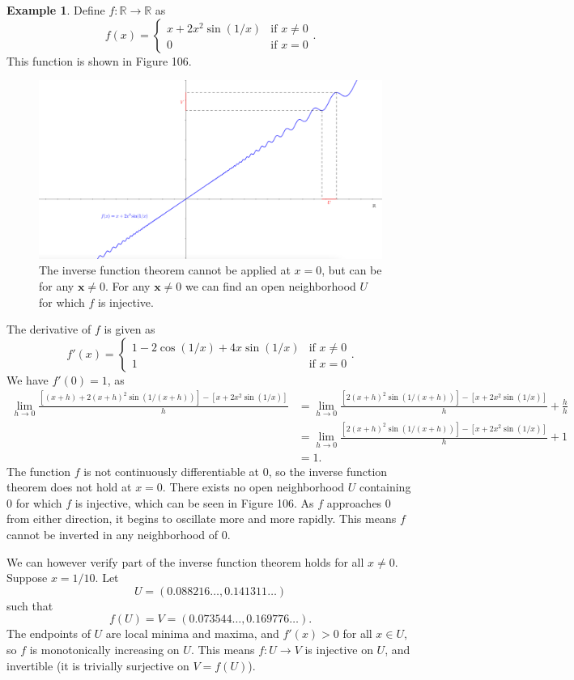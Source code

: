 \documentclass{article}
\newcommand{\R}{\mathbb{R}}
\newcommand{\x}{\mathbf{x}}
\theoremstyle{definition}
\newtheorem{example}{Example}[section]
\begin{document}
	\begin{example}
		Define $ f:\R\to\R $ as $$ f(x)=\begin{cases}
			x+2x^2\sin(1/x)&\text{if } x\neq 0\\
			0&\text{if }x=0
		\end{cases}.$$
		This function is shown in Figure 106. 
		\begin{figure}[h!]
			\centering
			\includegraphics[width=0.9\linewidth]{figures/ivt_ex1}
			\caption{The inverse function theorem cannot be applied at $ x=0 $, but can be for any $ \x \neq 0 $. For any $ \x\neq 0 $ we can find an open neighborhood $ U $ for which $ f $ is injective. }
			\label{fig:ivtex1}
		\end{figure}
		
		The derivative of $ f $ is given as 
		$$ f'(x)=\begin{cases}
			1-2\cos(1/x) + 4x\sin(1/x)&\text{if } x\neq 0\\
			1&\text{if }x=0
		\end{cases}.$$
		We have $ f'(0)=1 $, as 
		\begin{align*}
			\lim_{h\to0}\frac{[(x+h)+2(x+h)^2\sin(1/(x+h))]-[x+2x^2\sin(1/x)]}{h} & = 	\lim_{h\to0}\frac{[2(x+h)^2\sin(1/(x+h))]-[x+2x^2\sin(1/x)]}{h} + \frac{h}{h} \\ & = \lim_{h\to0}\frac{[2(x+h)^2\sin(1/(x+h))]-[x+2x^2\sin(1/x)]}{h} + 1 \\ & = 1.
		\end{align*}
		The function $ f $ is not continuously differentiable at $ 0 $, so the inverse function theorem does not hold at $ x=0 $. There exists no open neighborhood $ U $ containing $ 0 $ for which $ f $ is injective, which can be seen in Figure 106. As $ f $ approaches $ 0 $ from either direction, it begins to oscillate more and more rapidly. This means $ f $ cannot be inverted in any neighborhood of $ 0 $.  
		
		We can however verify part of the inverse function theorem holds for all $ x\neq 0 $. Suppose $ x = 1/10 $. Let $$ U = (0.088216\ldots , 0.141311\ldots) $$ such that $$ f(U)= V = (0.073544\ldots,0.169776\ldots).$$ The endpoints of $ U $ are local minima and maxima, and $ f'(x) > 0 $ for all $ x\in U $, so $ f $ is monotonically increasing on $ U $. This means $ f:U\to V $ is injective on $ U $, and invertible (it is trivially surjective on $ V=f(U) $).      
	\end{example}
\end{document}
